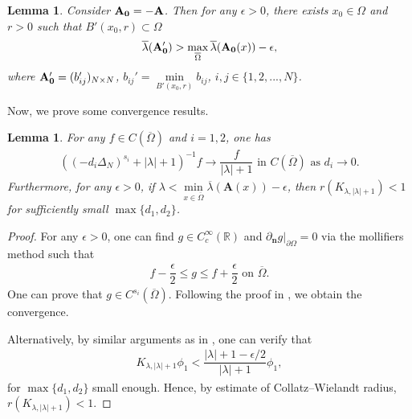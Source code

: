 \documentclass[a4paper,11pt]{amsart}
\newtheorem{lemma}[theorem]{Lemma}
\theoremstyle{definition}
\def\R{\mathbb{R}}
\def\O{\Omega}
\numberwithin{equation}{section}
\theoremstyle{definition}
\def\O{\Omega}
\begin{document}
\begin{lemma}\label{lemma7}
Consider ${\bf A_{0}=-A}$. Then for any $\epsilon>0$, there exists $x_0\in \Omega$ and $r>0$ such that $B'(x_0,r)\subset \O$
\begin{align*}
\overline{\lambda}({\bf A_0'})>\max_{\overline{\O}}\overline{\lambda}({\bf A_0}(x))-\epsilon,
\end{align*}
where ${\bf A_0'}=(b_{ij}')_{N\times N}$, $b_{ij}'=\min\limits_{B'(x_0,r)}b_{ij}$, $i,j\in \{1,2,...,N\}$.


\end{lemma}











Now, we prove some convergence results.



\begin{lemma}\label{Lemm8}
For any $f\in C(\overline{\O})$ and $i=1,2$, one has
\begin{align*}
((-d_i\Delta_N)^{s_i}+|\lambda| +1)^{-1}f\rightarrow \dfrac{f}{|\lambda|+1} \text{ in }C(\overline{\O}) \text { as }d_i \rightarrow 0.
\end{align*}
Furthermore, for any $\epsilon>0$, if $\lambda < \min\limits_{x\in\overline{\O}} \overline{\lambda}(\mathbf{A}(x)) - \epsilon$, then $r\left(K_{\lambda,|\lambda|+1}\right) < 1$ for sufficiently small $\max\{d_1,d_2\}$.
\end{lemma}
\begin{proof}
For any $\epsilon>0$, one can find $g\in C_c^\infty(\R)$ and $\partial_{\textbf{n}}g|_{\partial \O}=0$ via the mollifiers method such that
\begin{align*}
f-\dfrac{\epsilon}{2}\leq g \leq f+\dfrac{\epsilon}{2} \text{ on }\overline{\O}.
\end{align*}
One can prove that $g\in C^{s_i}(\overline{\O})$. 
 Following the proof in \cite[pp 41-42]{lam_ays_2016}, we obtain the convergence.
 
Alternatively, by similar arguments as in \cite[p. 442]{lam_ays_2016}, one can verify that
\begin{align*}
K_{\lambda,|\lambda|+1}\phi_1<\dfrac{|\lambda|+1-\epsilon/2}{|\lambda|+1}\phi_1,
\end{align*}
for $\max\{d_1,d_2\}$ small enough. Hence, by estimate of Collatz–Wielandt radius, $r(K_{\lambda,|\lambda|+1})<1$.





\end{proof}
\end{document}
